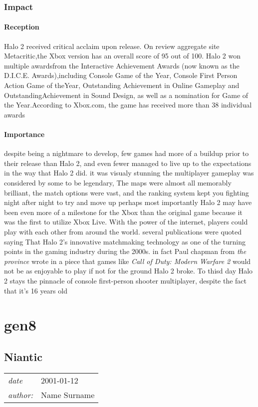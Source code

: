 \documentclass[a4paper,10pt]{book}
\newcommand{\pageHeader}[4]{
    \section{#1}
    \vspace{-0.3cm}
    \begin{table}[h!]
     \begin{tabular}{ll}
        \hline
        \textit{date} & #2 \\
        \textit{author: } & #3\\
        \hline
     \end{tabular}
    \end{table}
    \vspace{-0.3cm}
}
\begin{document}
 
 \subsection{Impact }
 
 \subsubsection{Reception }
 
          Halo 2 received critical acclaim upon release.  On review aggregate site Metacritic,the Xbox version has an overall score of 95 out of 100. 
          Halo 2 won multiple awardsfrom the Interactive Achievement Awards (now known as the D.I.C.E. Awards),including Console Game of the Year, Console First Person Action Game of theYear,
          Outstanding Achievement in Online Gameplay and OutstandingAchievement in Sound Design, as well as a nomination for Game of the Year.According to Xbox.com, the game has received more than 38 individual awards
         
 
 \subsubsection{Importance }
 
          despite being a nightmare to develop, few games had more of a buildup prior to their release than Halo 2, and even fewer managed to live up to the expectations in the way that Halo 2 did.
          it was visualy stunning the multiplayer gameplay was considered by some to be legendary, The maps were almost all memorably brilliant, the match options were vast, and the ranking system kept
          you fighting night after night to try and move up perhaps most importantly Halo 2 may have been even more of a milestone for the Xbox than the original game because it was the
          first to utilize Xbox Live. With the power of the internet, players could play with each other from around the world. several publications were quoted saying That
          Halo 2's innovative matchmaking technology as one of the turning points in the gaming industry during the 2000s. in fact Paul chapman from  \textit{the province } 
          wrote in a piece that games like  \textit{ Call of Duty: Modern Warfare 2 } would not be as enjoyable to play if not for the ground Halo 2 broke. To thisd day Halo 2 stays the pinnacle 
          of console first-person shooter multiplayer, despite the fact that it's 16 years old

         
 \newpage\chapter{gen8}\newpage\pageHeader{Niantic}{2001-01-12}{Name Surname}{Best template ever, long live the CSS LEADERS!!}
\end{document}
